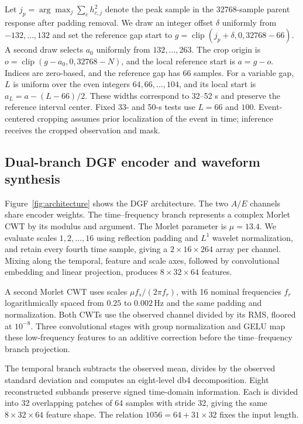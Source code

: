 \documentclass[10pt,prd,aps,a4paper,twocolumn,superscriptaddress,nofootinbib,floatfix]{revtex4-2}
\begin{document}
Let $j_p=\arg\max_j\sum_ch_{c,j}^2$ denote the peak sample in the 32768-sample parent response after padding removal. We draw an integer offset $\delta$ uniformly from $-132,\ldots,132$ and set the reference gap start to $g=\operatorname{clip}(j_p+\delta,0,32768-66)$. A second draw selects $a_0$ uniformly from $132,\ldots,263$. The crop origin is $o=\operatorname{clip}(g-a_0,0,32768-N)$, and the local reference start is $a=g-o$. Indices are zero-based, and the reference gap has 66 samples. For a variable gap, $L$ is uniform over the even integers $64,66,\ldots,104$, and its local start is $a_L=a-(L-66)/2$. These widths correspond to 32--52 s and preserve the reference interval center. Fixed 33- and 50-s tests use $L=66$ and $100$. Event-centered cropping assumes prior localization of the event in time; inference receives the cropped observation and mask.

\subsection{Dual-branch DGF encoder and waveform synthesis}\label{sec:architecture}
Figure~\ref{fig:architecture} shows the DGF architecture. The two $A/E$ channels share encoder weights. The time--frequency branch represents a complex Morlet CWT by its modulus and argument. The Morlet parameter is $\mu=13.4$. We evaluate scales $1,2,\ldots,16$ using reflection padding and $L^1$ wavelet normalization, and retain every fourth time sample, giving a $2\times16\times264$ array per channel. Mixing along the temporal, feature and scale axes, followed by convolutional embedding and linear projection, produces $8\times32\times64$ features.

A second Morlet CWT uses scales $\mu f_s/(2\pi f_r)$, with 16 nominal frequencies $f_r$ logarithmically spaced from $0.25$ to $0.002\,\mathrm{Hz}$ and the same padding and normalization. Both CWTs use the observed channel divided by its RMS, floored at $10^{-8}$. Three convolutional stages with group normalization and GELU map these low-frequency features to an additive correction before the time--frequency branch projection.

The temporal branch subtracts the observed mean, divides by the observed standard deviation and computes an eight-level db4 decomposition. Eight reconstructed subbands preserve signed time-domain information. Each is divided into 32 overlapping patches of 64 samples with stride 32, giving the same $8\times32\times64$ feature shape. The relation $1056=64+31\times32$ fixes the input length.
\end{document}
